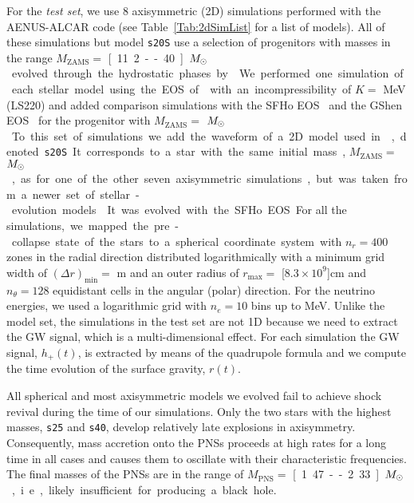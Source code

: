 {For the {\it test set}, we use $8$ axisymmetric (2D) simulations performed with the {\sc AENUS-ALCAR} code
(see Table~\ref{Tab:2dSimList} for a list of models).
All of these simulations but model \texttt{s20S} use a selection of progenitors with masses in the range} $M_{\mathrm{ZAMS}}=$ \unit[11.2 -- 40]{$M_{\odot}$}
 evolved through the hydrostatic phases by~\citep{Woosley_Heger_Weaver__2002__ReviewsofModernPhysics__The_evolution_and_explosion_of_massive_stars}.
We performed one simulation of each stellar model using the EOS of~\citep{Lattimer_Swesty__1991__NuclearPhysicsA__LS-EOS} with an incompressibility of $K=$ \unit[220]{MeV} (LS220) and added comparison simulations with the SFHo EOS~\citep{Steiner_et_al__2013__apj__Core-collapseSupernovaEquationsofStateBasedonNeutronStarObservations} and the GShen EOS~\citep{Shen_et_al__2011__prc__Newequationofstateforastrophysicalsimulations} for the {progenitor} with $M_{\mathrm{ZAMS}}=$ \unit[15]{$M_{\odot}$}.
To this set of simulations we add the waveform of a 2D model used in~\citep{Torres:2019a}, denoted \texttt{s20S}. It corresponds to a star with the same initial mass, $M_{\mathrm{ZAMS}}=$ \unit[20]{$M_{\odot}$}, as for one of the other seven axisymmetric simulations, but was taken from a newer set of stellar-evolution models~\citep{Woosley_Heger__2007__physrep__Nucleosynthesisandremnantsinmassivestarsofsolarmetallicity}. It was evolved with the SFHo EOS.


{For all the simulations,} we mapped the pre-collapse state of the stars to a spherical
coordinate system with $n_r = 400$ zones in the radial direction
distributed logarithmically with a minimum grid width of
$(\Delta r)_{\mathrm{min}}=$ \unit[400]{m} and an outer radius of
$r_{\mathrm{max}} =$ \unit[$8.3 \times 10^{9}$]{cm} and
$n_{\theta} = 128$ equidistant cells in the angular (polar) direction. For the
neutrino energies, we used a logarithmic grid with $n_e = 10$ bins up
to \unit[240]{MeV}.
{Unlike the model set, the simulations in the test set are not 1D because we need to 
extract the GW signal, which is a multi-dimensional effect. For each simulation
the GW signal, $h_+(t)$, is extracted by means of the quadrupole formula and we compute the 
time evolution of the surface gravity, $r(t)$.}

All spherical and most axisymmetric models we evolved fail to achieve shock
revival during the time of our simulations. Only the two stars with
the highest masses, \texttt{s25} and \texttt{s40}, develop relatively
late explosions in axisymmetry. Consequently, mass accretion onto the
PNSs proceeds at high rates for a long time in all cases and causes
them to oscillate with their characteristic frequencies. The final
masses of the PNSs are in the range of
$M_{\mathrm{PNS}} =$ \unit[1.47 -- 2.33]{$M_{\odot}$}, i.e., likely insufficient for
producing a black hole.


 	

